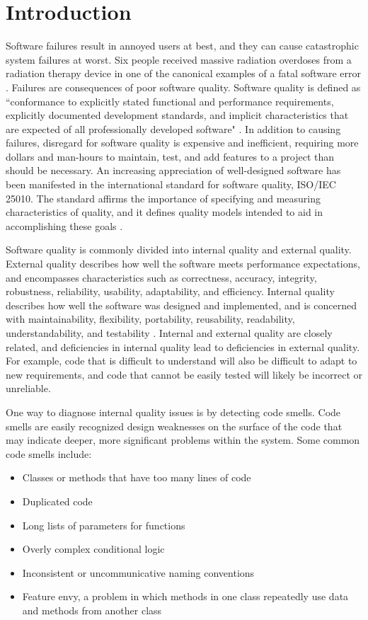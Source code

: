 \documentclass{sig-alternate}
\begin{document}
\section{Introduction}
\label{sec:intro}
Software failures result in annoyed users at best, and they can cause
catastrophic system failures at worst. Six people received massive radiation
overdoses from a radiation therapy device in one of the canonical examples of a
fatal software error \cite{leveson1995therac}. Failures are consequences of poor
software quality. Software quality is defined as ``conformance to explicitly
stated functional and performance requirements, explicitly documented
development standards, and implicit characteristics that are expected of all
professionally developed software" \cite{pressman1997}. In addition to causing
failures, disregard for software quality is expensive and inefficient, requiring
more dollars and man-hours to maintain, test, and add features to a project than
should be necessary. An increasing appreciation of well-designed software has
been manifested in the international standard for software quality, ISO/IEC
25010. The standard affirms the importance of specifying and measuring
characteristics of quality, and it defines quality models intended to aid in
accomplishing these goals \cite{iso2011iec}.

Software quality is commonly divided into internal quality and external quality.
External quality describes how well the software meets performance expectations,
and encompasses characteristics such as correctness, accuracy, integrity,
robustness, reliability, usability, adaptability, and efficiency. Internal
quality describes how well the software was designed and implemented, and is
concerned with maintainability, flexibility, portability, reusability,
readability, understandability, and testability
\cite{mcconnell1993codecomplete}. Internal and external quality are closely
related, and deficiencies in internal quality lead to deficiencies in external
quality. For example, code that is difficult to understand will also be
difficult to adapt to new requirements, and code that cannot be easily tested
will likely be incorrect or unreliable. 

One way to diagnose internal quality issues is by detecting code smells. Code
smells are easily recognized design weaknesses on the surface of the code that
may indicate deeper, more significant problems within the system. Some common
code smells include:
\begin{itemize}
	\item Classes or methods that have too many lines of code
	\item Duplicated code
	\item Long lists of parameters for functions
	\item Overly complex conditional logic
	\item Inconsistent or uncommunicative naming conventions
	\item Feature envy, a problem in which methods in one class repeatedly use
		data and methods from another class
\end{itemize}
\end{document}
